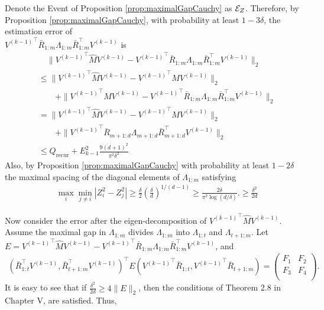 Denote the Event of Proposition \ref{prop:maximalGapCauchy} as $\mathcal{E}_{Z}$.
Therefore, by Proposition \ref{prop:maximalGapCauchy}, with probability at least $1-3\delta$, 
the estimation error of \\ ${V^{(k-1)}}^\top\bar{R}_{1:m}\Lambda_{1:m} \bar{R}_{1:m}^{\top} V^{(k-1)}$ is 
\begin{align*}
& \quad \| {V^{(k-1)}}^\top \hat{M}V^{(k-1)} - {V^{(k-1)}}^\top\bar{R}_{1:m}\Lambda_{1:m} \bar{R}_{1:m}^{\top} V^{(k-1)} \|_2 \\
& \le \|{V^{(k-1)}}^\top \hat{M}V^{(k-1)} - {V^{(k-1)}}^\top MV^{(k-1)}\|_2 \\
& \qquad + \| {V^{(k-1)}}^\top MV^{(k-1)} -{V^{(k-1)}}^\top\bar{R}_{1:m}\Lambda_{1:m} \bar{R}_{1:m}^{\top} V^{(k-1)} \|_2 \\
&  = \|{V^{(k-1)}}^\top \hat{M}V^{(k-1)} - {V^{(k-1)}}^\top MV^{(k-1)}\|_2 \\
& \qquad + \|{V^{(k-1)}}^\top\bar{R}_{m+1:d}\Lambda_{m+1:d}\bar{R}_{m+1:d}^{\top} V^{(k-1)} \|_2 \\
& \le Q_{\text{recur}} + E_{k-1}^2 \frac{9(d+1)^2}{\pi^2\delta^2} 
\end{align*}
Also, by Proposition \ref{prop:maximalGapCauchy} with probability at least $1-2\delta$ the maximal spacing of the diagonal elements of $\Lambda_{1:m}$ satisfying
\begin{align*}
& \max_i\min_{j\neq i} |Z_i^2 - Z_j^2| \ge \frac{\delta}{2}\left(\frac{\delta}{d}\right)^{1/(d-1)}\ge \frac{2\delta}{\pi^2 \log(d/\delta)}. \ge \frac{\delta^2}{2d}
\end{align*}

Now consider the error after the eigen-decomposition of ${V^{(k-1)}}^\top \hat{M}V^{(k-1)}$. Assume the maximal gap in $\Lambda_{1:m}$ divides $\Lambda_{1:m}$ into $\Lambda_{1:t}$ and $\Lambda_{t+1:m}$.
Let $E ={V^{(k-1)}}^\top \hat{M}V^{(k-1)} - {V^{(k-1)}}^\top\bar{R}_{1:m}\Lambda_{1:m} \bar{R}_{1:m}^{\top} V^{(k-1)}$, and 
\begin{align*}
( \bar{R}_{1:t}^\top V^{(k-1)}, \bar{R}_{t+1:m}^\top V^{(k-1)})^{\top} E ( {V^{(k-1)}}^\top \bar{R}_{1:t},  {V^{(k-1)}}^\top\bar{R}_{t+1:m})
=
\left(
\begin{array}{cc}
F_{1} & F_{2}\\
F_{3} & F_{4} \\
\end{array} 
\right).
\end{align*}
It is easy to see that if $\frac{\delta^2}{2d} \ge 4\|E\|_2 $, then the conditions of Theorem 2.8 in Chapter V, \citep{stewart1990matrix} are satisfied. Thus,


